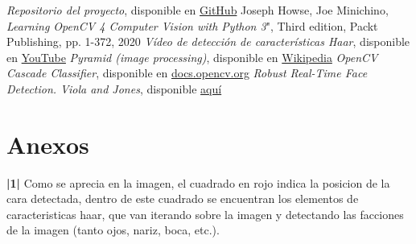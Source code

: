 \documentclass[a4paper]{article}
\begin{document}
\newpage
\begin{thebibliography}{99}
 \textit{Repositorio del proyecto}, disponible en \href{https://github.com/PacktPublishing/Learning-OpenCV-4-Computer-Vision-with-Python-Third-Edition}{GitHub}
 Joseph Howse, Joe Minichino, \textit{Learning OpenCV 4 Computer Vision with Python 3}", Third edition, Packt Publishing, pp. 1-372, 2020
 \textit{Vídeo de detección de características Haar}, disponible en \href{https://youtu.be/hPCTwxF0qf4}{YouTube}
 \textit{Pyramid (image processing)}, disponible en \href{https://en.wikipedia.org/wiki/Pyramid_(image_processing)}{Wikipedia}
 \textit{OpenCV Cascade Classifier}, disponible en \href{https://docs.opencv.org/3.4/db/d28/tutorial_cascade_classifier.html}{docs.opencv.org}
 \textit{Robust Real-Time Face Detection. Viola and Jones}, disponible \href{https://www.face-rec.org/algorithms/Boosting-Ensemble/16981346.pdf}{aquí}
\end{thebibliography}

\newpage
\section*{Anexos}
\textbf{|1|} Como se aprecia en la imagen, el cuadrado en rojo indica la posicion de la cara detectada, dentro de este cuadrado se encuentran los elementos de caracteristicas haar, que van iterando sobre la imagen y detectando las facciones de la imagen (tanto ojos, nariz, boca, etc.).
\end{document}
